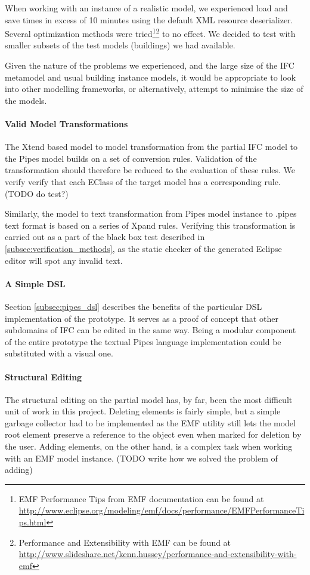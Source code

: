 When working with an instance of a realistic model, we experienced load and save times in excess of 10 minutes using the default XML resource deserializer. Several optimization methods were tried\footnote{EMF Performance Tips from EMF documentation can be found at \url{http://www.eclipse.org/modeling/emf/docs/performance/EMFPerformanceTips.html}}\footnote{Performance and Extensibility with EMF can be found at \url{http://www.slideshare.net/kenn.hussey/performance-and-extensibility-with-emf}} to no effect. We decided to test with smaller subsets of the test models (buildings) we had available.

Given the nature of the problems we experienced, and the large size of the IFC metamodel and usual building instance models, it would be appropriate to look into other modelling frameworks, or alternatively, attempt to minimise the size of the models.

\paragraph{Valid Model Transformations} The Xtend based model to model transformation from the partial IFC model to the Pipes model builds on a set of conversion rules. Validation of the transformation should therefore be reduced to the evaluation of these rules. We verify verify that each EClass of the target model has a corresponding rule. (TODO do test?) 

Similarly, the model to text transformation from Pipes model instance to .pipes text format is based on a series of Xpand rules. Verifying this transformation is carried out as a part of the black box test described in \ref{subsec:verification_methods}, as the static checker of the generated Eclipse editor will spot any invalid text.

\paragraph{A Simple DSL} Section \ref{subsec:pipes_dsl} describes the benefits of the particular DSL implementation of the prototype. It serves as a proof of concept that other subdomains of IFC can be edited in the same way. Being a modular component of the entire prototype the textual Pipes language implementation could be substituted with a visual one.

\paragraph{Structural Editing} The structural editing on the partial model has, by far, been the most difficult unit of work in this project. Deleting elements is fairly simple, but a simple garbage collector had to be implemented as the EMF utility still lets the model root element preserve a reference to the object even when marked for deletion by the user. Adding elements, on the other hand, is a complex task when working with an EMF model instance. (TODO write how we solved the problem of adding)



